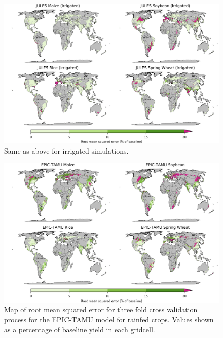 \documentclass[10pt]{article}
\begin{document}
\begin{figure}[h!]
\centering
\includegraphics[width=15.5cm]{JULES_spatial_MSE_ton_ha_irr.png}
\caption{Same as above for irrigated simulations.}
\label{fig:pdssatrmseirr}
\end{figure}

\begin{figure}[h!]
\centering
\includegraphics[width=15.5cm]{EPIC-TAMU_spatial_MSE_ton_ha.png}
\caption{Map of root mean squared error for three fold cross validation process for the EPIC-TAMU model for rainfed crops. Values shown as a percentage of baseline yield in each gridcell.}
\label{fig:pdssatrmse}
\end{figure}
\end{document}
